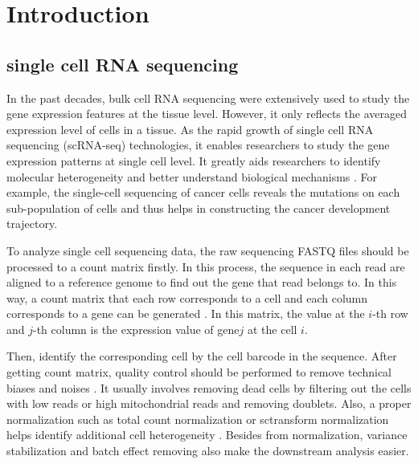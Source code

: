\section{Introduction}

\subsection{single cell RNA sequencing}

In the past decades, bulk cell RNA sequencing were extensively used to study the gene expression features at the tissue level. However, it only reflects the averaged expression level of cells in a tissue. As the rapid growth of single cell RNA sequencing (scRNA-seq) technologies, it enables researchers to study the gene expression patterns at single cell level. It greatly aids researchers to identify molecular heterogeneity and better understand biological mechanisms \cite{shapiro2013single}. For example, the single-cell sequencing of cancer cells reveals the mutations on each sub-population of cells and thus helps in constructing the cancer development trajectory. 

To analyze single cell sequencing data, the raw sequencing FASTQ files should be processed to a count matrix firstly. In this process, the sequence in each read are aligned to a reference genome to find out the gene that read belongs to. In this way, a count matrix that each row corresponds to a cell and each column corresponds to a gene can be generated \cite{petukhov2017accurate}. In this matrix, the value at the $i$-th row and $j$-th column is the expression value of gene$j$ at the cell $i$.

Then, identify the corresponding cell by the cell barcode in the sequence. After getting count matrix, quality control should be performed to remove technical biases and noises \cite{van2017single}. It usually involves removing dead cells by filtering out the cells with low reads or high mitochondrial reads and removing doublets. Also, a proper normalization such as total count normalization or sctransform normalization helps identify additional cell heterogeneity \cite{vallejos2017normalizing}. Besides from normalization, variance stabilization and batch effect removing also make the downstream analysis easier.

